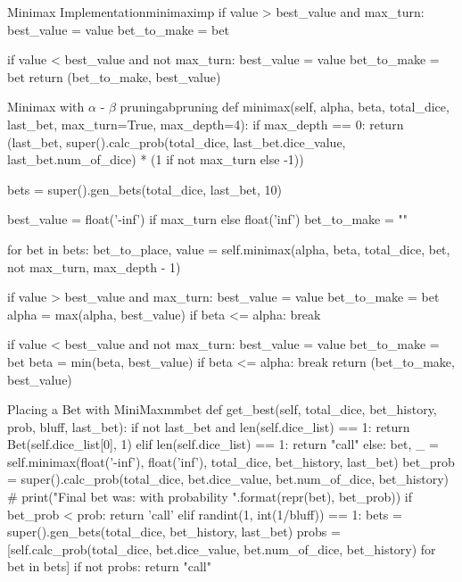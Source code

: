 \begin{appendices}
\begin{myminted}{Minimax Implementation}{minimaximp}
                if value > best_value and max_turn:
                    best_value = value
                    bet_to_make = bet

                if value < best_value and not max_turn:
                    best_value = value
                    bet_to_make = bet
            return (bet_to_make, best_value)
    \end{myminted}

    \begin{myminted}{Minimax with $\alpha$ - $\beta$ pruning}{abpruning}
        def minimax(self, alpha, beta, total_dice, last_bet, max_turn=True, max_depth=4):
            if max_depth == 0:
                return (last_bet, super().calc_prob(total_dice, last_bet.dice_value, last_bet.num_of_dice) * (1 if not max_turn else -1))

            bets = super().gen_bets(total_dice, last_bet, 10)

            best_value = float('-inf') if max_turn else float('inf')
            bet_to_make = ""

            for bet in bets:
                bet_to_place, value = self.minimax(alpha, beta, total_dice, bet, not max_turn, max_depth - 1)

                if value > best_value and max_turn:
                    best_value = value
                    bet_to_make = bet
                    alpha = max(alpha, best_value)
                    if beta <= alpha:
                        break

                if value < best_value and not max_turn:
                    best_value = value
                    bet_to_make = bet
                    beta = min(beta, best_value)
                    if beta <= alpha:
                        break
            return (bet_to_make, best_value)
    \end{myminted}

    \begin{myminted}{Placing a Bet with MiniMax}{mmbet}
        def get_best(self, total_dice, bet_history, prob, bluff, last_bet):
            if not last_bet and len(self.dice_list) == 1:
                return Bet(self.dice_list[0], 1)
            elif len(self.dice_list) == 1:
                return "call"
            else:
                bet, _ = self.minimax(float('-inf'), float('inf'), total_dice, bet_history, last_bet)
                bet_prob = super().calc_prob(total_dice, bet.dice_value, bet.num_of_dice, bet_history)
                # print("Final bet was: {} with probability {}".format(repr(bet), bet_prob))
                if bet_prob < prob:
                    return 'call'
                elif randint(1, int(1/bluff)) == 1:
                    bets = super().gen_bets(total_dice, bet_history, last_bet)
                    probs = [self.calc_prob(total_dice, bet.dice_value, bet.num_of_dice, bet_history) for bet in bets]
                    if not probs:
                        return "call"


\end{myminted}
\end{appendices}
